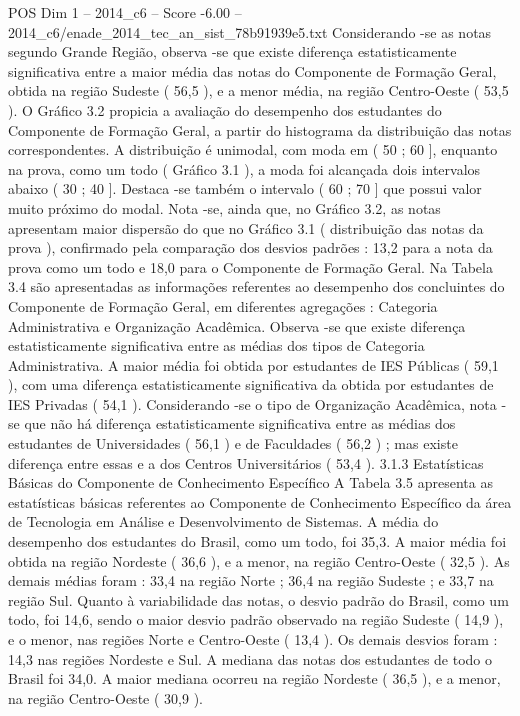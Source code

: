 \begin{textsample}{POS Dim 1 – 2014\_c6 – Score -6.00 – 2014\_c6/enade\_2014\_tec\_an\_sist\_78b91939e5.txt}
Considerando -se as notas segundo Grande Região, observa -se que existe diferença estatisticamente significativa entre a maior média das notas do Componente de Formação Geral, obtida na região Sudeste ( 56,5 ), e a menor média, na região Centro-Oeste ( 53,5 ).
O Gráfico 3.2 propicia a avaliação do desempenho dos estudantes do Componente de Formação Geral, a partir do histograma da distribuição das notas correspondentes.
A distribuição é unimodal, com moda em ( 50 ; 60 ], enquanto na prova, como um todo ( Gráfico 3.1 ), a moda foi alcançada dois intervalos abaixo ( 30 ; 40 ].
Destaca -se também o intervalo ( 60 ; 70 ] que possui valor muito próximo do modal.
Nota -se, ainda que, no Gráfico 3.2, as notas apresentam maior dispersão do que no Gráfico 3.1 ( distribuição das notas da prova ), confirmado pela comparação dos desvios padrões : 13,2 para a nota da prova como um todo e 18,0 para o Componente de Formação Geral.
Na Tabela 3.4 são apresentadas as informações referentes ao desempenho dos concluintes do Componente de Formação Geral, em diferentes agregações : Categoria Administrativa e Organização Acadêmica.
Observa -se que existe diferença estatisticamente significativa entre as médias dos tipos de Categoria Administrativa.
A maior média foi obtida por estudantes de IES Públicas ( 59,1 ), com uma diferença estatisticamente significativa da obtida por estudantes de IES Privadas ( 54,1 ).
Considerando -se o tipo de Organização Acadêmica, nota -se que não há diferença estatisticamente significativa entre as médias dos estudantes de Universidades ( 56,1 ) e de Faculdades ( 56,2 ) ; mas existe diferença entre essas e a dos Centros Universitários ( 53,4 ). 3.1.3 Estatísticas Básicas do Componente de Conhecimento Específico A Tabela 3.5 apresenta as estatísticas básicas referentes ao Componente de Conhecimento Específico da área de Tecnologia em Análise e Desenvolvimento de Sistemas.
A média do desempenho dos estudantes do Brasil, como um todo, foi 35,3.
A maior média foi obtida na região Nordeste ( 36,6 ), e a menor, na região Centro-Oeste ( 32,5 ).
As demais médias foram : 33,4 na região Norte ; 36,4 na região Sudeste ; e 33,7 na região Sul.
Quanto à variabilidade das notas, o desvio padrão do Brasil, como um todo, foi 14,6, sendo o maior desvio padrão observado na região Sudeste ( 14,9 ), e o menor, nas regiões Norte e Centro-Oeste ( 13,4 ).
Os demais desvios foram : 14,3 nas regiões Nordeste e Sul.
A mediana das notas dos estudantes de todo o Brasil foi 34,0.
A maior mediana ocorreu na região Nordeste ( 36,5 ), e a menor, na região Centro-Oeste ( 30,9 ).

\end{textsample}
